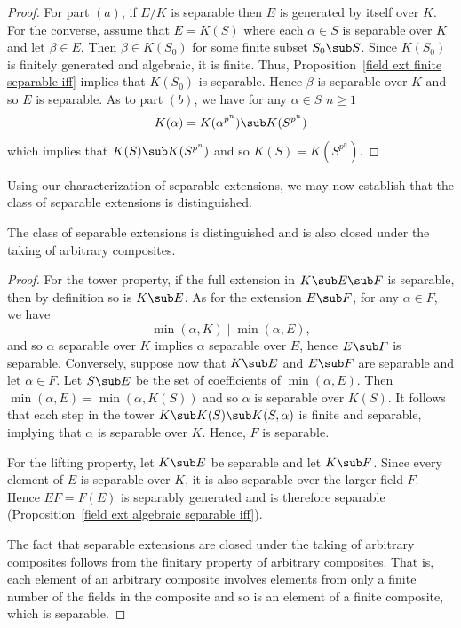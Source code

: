 \begin{proof}
For part $(a)$, if $E/K$ is separable then $E$ is generated by itself over $K$. For the converse, assume that $E=K(S)$ where each $\alpha\in S$ is separable over $K$ and let $\beta\in E$. Then $\beta\in K(S_0)$ for some finite subset $S_0\sub S$. Since $K(S_0)$ is finitely generated and algebraic, it is finite. Thus, Proposition~\ref{field ext finite separable iff} implies that $K(S_0)$ is separable. Hence $\beta$ is separable over $K$ and so $E$ is separable. As to part $(b)$, we have for any $\alpha\in S$ $n\geq 1$
\[K(\alpha)=K(\alpha^{p^n})\sub K(S^{p^n})\]
which implies that $K(S)\sub K(S^{p^n})$ and so $K(S)=K(S^{p^n})$. 
\end{proof}
Using our characterization of separable extensions, we may now establish that the class of separable extensions is distinguished.
\begin{proposition}
The class of separable extensions is distinguished and is also closed under the taking of arbitrary composites.
\end{proposition}
\begin{proof}
For the tower property, if the full extension in $K\sub E\sub F$ is separable, then by definition so is $K\sub E$. As for the extension $E\sub F$, for any $\alpha\in F$, we have
\[\min(\alpha,K)\mid\min(\alpha,E),\]
and so $\alpha$ separable over $K$ implies $\alpha$ separable over $E$, hence $E\sub F$ is separable. Conversely, suppose now that $K\sub E$ and $E\sub F$ are separable and let $\alpha\in F$. Let $S\sub E$ be the set of coefficients of $\min(\alpha,E)$. Then $\min(\alpha,E)=\min(\alpha,K(S))$ and so $\alpha$ is separable over $K(S)$. It follows that each step in the
tower  $K\sub K(S)\sub K(S,\alpha)$ is finite and separable, implying that $\alpha$ is separable over $K$. Hence, $F$ is separable.\par
For the lifting property, let $K\sub E$ be separable and let $K\sub F$. Since every element of $E$ is separable over $K$, it is also separable over the larger field $F$. Hence $EF=F(E)$ is separably generated and is therefore separable (Proposition~\ref{field ext algebraic separable iff}).\par
The fact that separable extensions are closed under the taking of arbitrary
composites follows from the finitary property of arbitrary composites. That is, each element of an arbitrary composite involves elements from only a finite number of the fields in the composite and so is an element of a finite composite, which is separable.
\end{proof}
